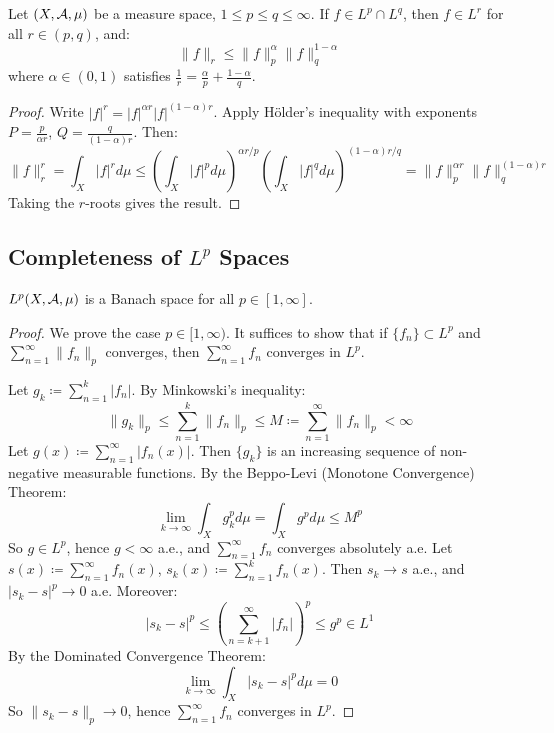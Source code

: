 \begin{theorem}
Let \( (X, \mathcal{A}, \mu) \) be a measure space, \( 1 \leq p \leq q \leq \infty \). If \( f \in L^p \cap L^q \), then \( f \in L^r \) for all \( r \in (p, q) \), and:
\[
\|f\|_r \leq \|f\|_p^\alpha \|f\|_q^{1 - \alpha}
\]
where \( \alpha \in (0, 1) \) satisfies \( \frac{1}{r} = \frac{\alpha}{p} + \frac{1 - \alpha}{q} \).
\end{theorem}

\begin{proof}
Write \( |f|^r = |f|^{\alpha r} |f|^{(1 - \alpha)r} \). Apply Hölder's inequality with exponents \( P = \frac{p}{\alpha r} \), \( Q = \frac{q}{(1 - \alpha)r} \). Then:
\[
\|f\|_r^r = \int_X |f|^r  d\mu \leq \left( \int_X |f|^p  d\mu \right)^{\alpha r / p} \left( \int_X |f|^q  d\mu \right)^{(1 - \alpha)r / q} = \|f\|_p^{\alpha r} \|f\|_q^{(1 - \alpha)r}
\]
Taking the \( r \)-roots gives the result.
\end{proof}

\clearpage
\subsection{Completeness of \( L^p \) Spaces}

\begin{theorem}
\( L^p(X, \mathcal{A}, \mu) \) is a Banach space for all \( p \in [1, \infty] \).
\end{theorem}

\begin{proof}
We prove the case \( p \in [1, \infty) \). It suffices to show that if \( \{f_n\} \subset L^p \) and \( \sum_{n=1}^{\infty} \|f_n\|_p \) converges, then \( \sum_{n=1}^{\infty} f_n \) converges in \( L^p \).

Let \( g_k \coloneqq \sum_{n=1}^{k} |f_n| \). By Minkowski's inequality:
\[
\|g_k\|_p \leq \sum_{n=1}^{k} \|f_n\|_p \leq M \coloneqq \sum_{n=1}^{\infty} \|f_n\|_p < \infty
\]
Let \( g(x) \coloneqq \sum_{n=1}^{\infty} |f_n(x)| \). Then \( \{g_k\} \) is an increasing sequence of non-negative measurable functions. By the Beppo-Levi (Monotone Convergence) Theorem:
\[
\lim_{k \to \infty} \int_X g_k^p  d\mu = \int_X g^p  d\mu \leq M^p
\]
So \( g \in L^p \), hence \( g < \infty \) a.e., and \( \sum_{n=1}^{\infty} f_n \) converges absolutely a.e. Let \( s(x) \coloneqq \sum_{n=1}^{\infty} f_n(x) \), \( s_k(x) \coloneqq \sum_{n=1}^{k} f_n(x) \). Then \( s_k \to s \) a.e., and \( |s_k - s|^p \to 0 \) a.e. Moreover:
\[
|s_k - s|^p \leq \left( \sum_{n=k+1}^{\infty} |f_n| \right)^p \leq g^p \in L^1
\]
By the Dominated Convergence Theorem:
\[
\lim_{k \to \infty} \int_X |s_k - s|^p  d\mu = 0
\]
So \( \|s_k - s\|_p \to 0 \), hence \( \sum_{n=1}^{\infty} f_n \) converges in \( L^p \).
\end{proof}

